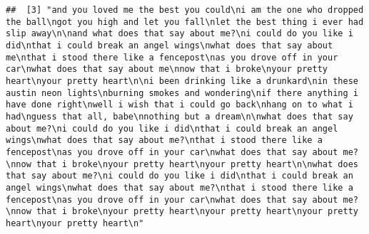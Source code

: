 \documentclass[]{article}
\begin{document}
\begin{verbatim}
##  [3] "and you loved me the best you could\ni am the one who dropped the ball\ngot you high and let you fall\nlet the best thing i ever had slip away\n\nand what does that say about me?\ni could do you like i did\nthat i could break an angel wings\nwhat does that say about me\nthat i stood there like a fencepost\nas you drove off in your car\nwhat does that say about me\nnow that i broke\nyour pretty heart\nyour pretty heart\n\ni been drinking like a drunkard\nin these austin neon lights\nburning smokes and wondering\nif there anything i have done right\nwell i wish that i could go back\nhang on to what i had\nguess that all, babe\nnothing but a dream\n\nwhat does that say about me?\ni could do you like i did\nthat i could break an angel wings\nwhat does that say about me?\nthat i stood there like a fencepost\nas you drove off in your car\nwhat does that say about me?\nnow that i broke\nyour pretty heart\nyour pretty heart\n\nwhat does that say about me?\ni could do you like i did\nthat i could break an angel wings\nwhat does that say about me?\nthat i stood there like a fencepost\nas you drove off in your car\nwhat does that say about me?\nnow that i broke\nyour pretty heart\nyour pretty heart\nyour pretty heart\nyour pretty heart\n"                                                                                                                                                                                                                                                                                                                                                                                                                                                                                                                                                                                                                                                                                                                                                                                                                                                                                                                                                                                                                                                                                                                                                                                                                                                                                                                                                                                                                                                                                                                                                                                                                                                                                   

\end{verbatim}
\end{document}
